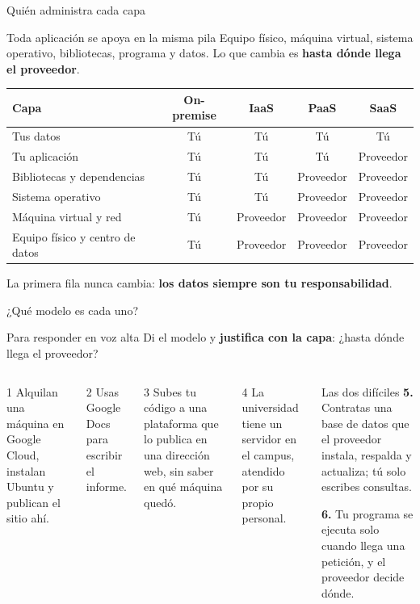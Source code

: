 \documentclass[aspectratio=169,10pt,c]{beamer}
\begin{document}
\begin{frame}{Quién administra cada capa}
\begin{block}{Toda aplicación se apoya en la misma pila}
\small Equipo físico, máquina virtual, sistema operativo, bibliotecas, programa y datos. Lo que cambia es \textbf{hasta dónde llega el proveedor}.
\end{block}
\renewcommand{\arraystretch}{1.3}
\centering\small
\begin{tabular}{@{}p{5.4cm}cccc@{}}
\toprule
\textbf{Capa} & \textbf{On-premise} & \textbf{IaaS} & \textbf{PaaS} & \textbf{SaaS}\\
\midrule
Tus datos & Tú & Tú & Tú & Tú\\
Tu aplicación & Tú & Tú & Tú & Proveedor\\
Bibliotecas y dependencias & Tú & Tú & Proveedor & Proveedor\\
Sistema operativo & Tú & Tú & Proveedor & Proveedor\\
Máquina virtual y red & Tú & Proveedor & Proveedor & Proveedor\\
Equipo físico y centro de datos & Tú & Proveedor & Proveedor & Proveedor\\
\bottomrule
\end{tabular}
\par\vspace{3mm}
\small La primera fila nunca cambia: \textbf{los datos siempre son tu responsabilidad}.
\end{frame}

\begin{frame}{¿Qué modelo es cada uno?}
\begin{block}{Para responder en voz alta}
\small Di el modelo y \textbf{justifica con la capa}: ¿hasta dónde llega el proveedor?
\end{block}
\begin{columns}[T,onlytextwidth]
\begin{exampleblock}{1}
\small Alquilan una máquina en Google Cloud, instalan Ubuntu y publican el sitio ahí.
\end{exampleblock}
\begin{exampleblock}{2}
\small Usas Google Docs para escribir el informe.
\end{exampleblock}
\begin{exampleblock}{3}
\small Subes tu código a una plataforma que lo publica en una dirección web, sin saber en qué máquina quedó.
\end{exampleblock}
\begin{exampleblock}{4}
\small La universidad tiene un servidor en el campus, atendido por su propio personal.
\end{exampleblock}
\begin{alertblock}{Las dos difíciles}
\small
\textbf{5.} Contratas una base de datos que el proveedor instala, respalda y actualiza; tú solo escribes consultas.\par\smallskip
\textbf{6.} Tu programa se ejecuta solo cuando llega una petición, y el proveedor decide dónde.
\end{alertblock}
\end{columns}
\end{frame}
\end{document}
